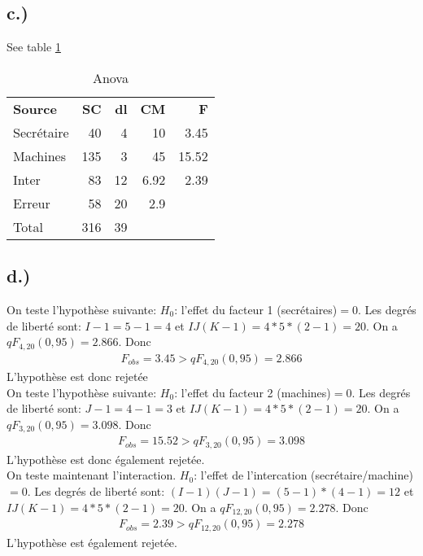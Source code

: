 \documentclass[a4paper]{article}
\begin{document}
\subsection*{c.)}
See table \ref{table:1}
	
		
\begin{table}[h!]
	\center
	\caption{Anova}
	\begin{tabular}{lrrrr}
		\textbf{Source} &	\textbf{SC} &	\textbf{dl} &	\textbf{CM} &	\textbf{F}	\\
		Secrétaire 		& 40			& 4				& 10			& 3.45			\\
		Machines		& 135			& 3				& 45			& 15.52			\\
		Inter			& 83			& 12			& 6.92			& 2.39			\\
		Erreur			& 58			& 20			& 2.9 			&				\\	
		\hline
		Total			& 316			& 39			&				&				\\
	\end{tabular}
	\label{table:1}
\end{table}
		
		
	\subsection*{d.)}
	On teste l'hypothèse suivante: $H_0$: l'effet du facteur 1 (secrétaires)$=0$. Les degrés de liberté sont: $I-1=5-1=4$ et $IJ(K-1)=4*5*(2-1)=20$. On a $qF_{4,20}(0,95)=2.866$. Donc
	\begin{eqnarray*}
		F_{obs}=3.45>qF_{4,20}(0,95)=2.866
	\end{eqnarray*}
	L'hypothèse est donc rejetée
	\\
	On teste l'hypothèse suivante: $H_0$: l'effet du facteur 2 (machines)$=0$. Les degrés de liberté sont: $J-1=4-1=3$ et $IJ(K-1)=4*5*(2-1)=20$. On a $qF_{3,20}(0,95)=3.098$. Donc
	\begin{eqnarray*}
		F_{obs}=15.52>qF_{3,20}(0,95)=3.098
	\end{eqnarray*}
	L'hypothèse est donc également rejetée.
	\\
	On teste maintenant l'interaction. $H_0$: l'effet de l'intercation (secrétaire/machine)$=0$. Les degrés de liberté sont: $(I-1)(J-1)=(5-1)*(4-1)=12$ et $IJ(K-1)=4*5*(2-1)=20$. On a $qF_{12,20}(0,95)=2.278$. Donc
	\begin{eqnarray*}
		F_{obs}=2.39>qF_{12,20}(0,95)=2.278
	\end{eqnarray*}
	L'hypothèse est également rejetée.
\end{document}
